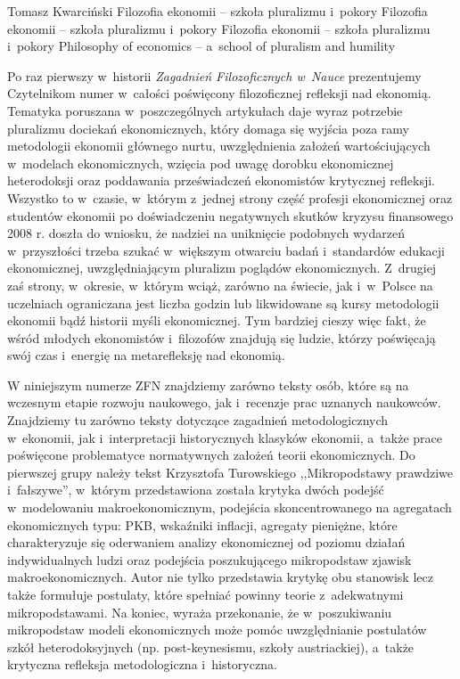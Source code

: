 \begin{editorial}{Tomasz Kwarciński}
	{Filozofia ekonomii -- szkoła pluralizmu i~pokory}
	{Filozofia ekonomii -- szkoła pluralizmu i~pokory}
	{Filozofia ekonomii -- szkoła pluralizmu i~pokory}
	{Philosophy of economics -- a~school of pluralism and humility}




\lettrine[loversize=0.13,lines=2,lraise=-0.05,nindent=0em,findent=0.2pt]%
{P}{}o raz pierwszy w~historii \textit{Zagadnień Filozoficznych w~Nauce} prezentujemy Czytelnikom numer w~całości poświęcony
filozoficznej refleksji nad ekonomią.  Tematyka poruszana w~poszczególnych artykułach daje wyraz potrzebie pluralizmu
dociekań ekonomicznych, który domaga się wyjścia poza ramy metodologii ekonomii głównego nurtu, uwzględnienia założeń
wartościujących w~modelach ekonomicznych, wzięcia pod uwagę dorobku ekonomicznej heterodoksji oraz poddawania
przeświadczeń ekonomistów krytycznej refleksji. Wszystko to w~czasie, w~którym z~jednej strony część profesji
ekonomicznej oraz studentów ekonomii po doświadczeniu negatywnych skutków kryzysu finansowego 2008 r. doszła do
wniosku, że nadziei na uniknięcie podobnych wydarzeń w~przyszłości trzeba szukać w~większym otwarciu badań i~standardów
edukacji ekonomicznej, uwzględniającym pluralizm poglądów ekonomicznych. Z~drugiej zaś strony, w~okresie, w~którym
wciąż, zarówno na świecie, jak i~w~Polsce na uczelniach ograniczana jest liczba godzin lub likwidowane są kursy
metodologii ekonomii bądź historii myśli ekonomicznej. Tym bardziej cieszy więc fakt, że wśród młodych
ekonomistów i~filozofów znajdują się ludzie, którzy poświęcają swój czas i~energię na metarefleksję nad ekonomią. 

W niniejszym numerze ZFN znajdziemy zarówno teksty osób, które są na wczesnym etapie rozwoju naukowego, jak i~recenzje
prac uznanych naukowców. Znajdziemy tu zarówno teksty dotyczące zagadnień metodologicznych w~ekonomii,
jak i~interpretacji historycznych klasyków ekonomii, a~także prace poświęcone problematyce normatywnych założeń teorii
ekonomicznych. Do pierwszej grupy należy tekst Krzysztofa Turowskiego ,,Mikropodstawy prawdziwe i~fałszywe'', w~którym
przedstawiona została krytyka dwóch podejść w~modelowaniu makroekonomicznym, podejścia skoncentrowanego na agregatach
ekonomicznych typu: PKB, wskaźniki inflacji, agregaty pieniężne, które charakteryzuje się oderwaniem analizy
ekonomicznej od poziomu działań indywidualnych ludzi oraz podejścia poszukującego mikropodstaw zjawisk
makroekonomicznych. Autor nie tylko przedstawia krytykę obu stanowisk lecz także formułuje postulaty, które spełniać
powinny teorie z~adekwatnymi mikropodstawami. Na koniec, wyraża przekonanie, że w~poszukiwaniu mikropodstaw modeli
ekonomicznych może pomóc uwzględnianie postulatów szkół heterodoksyjnych (np. post-keynesismu, szkoły austriackiej),
a~także krytyczna refleksja metodologiczna i~historyczna.


\end{editorial}
